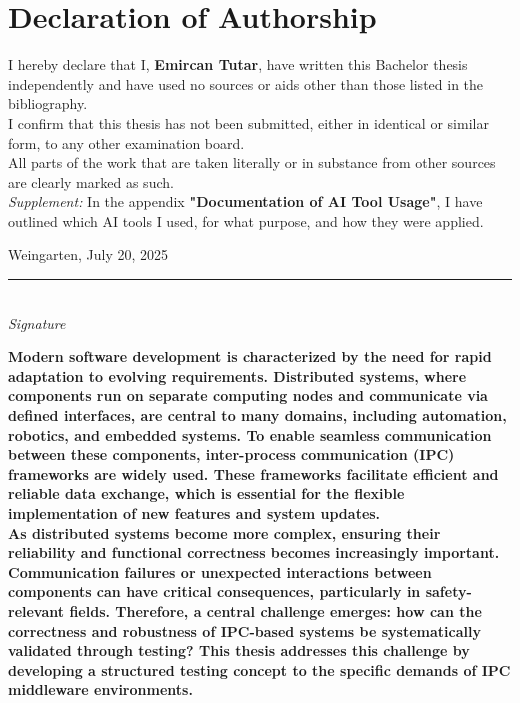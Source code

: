 \documentclass[a4paper,12pt,singlespacing]{article}
\begin{document}
\cleardoublepage
\thispagestyle{empty}

\section*{Declaration of Authorship}
\vspace{2cm}

I hereby declare that I, \textbf{Emircan Tutar}, have written this Bachelor thesis independently and have used no sources or aids other than those listed in the bibliography.\\[0.5cm]

I confirm that this thesis has not been submitted, either in identical or similar form, to any other examination board.\\[0.5cm]

All parts of the work that are taken literally or in substance from other sources are clearly marked as such.\\[0.5cm]

\textit{Supplement:} In the appendix \textbf{"Documentation of AI Tool Usage"}, I have outlined which AI tools I used, for what purpose, and how they were applied.

\vspace{3cm}
Weingarten, July 20, 2025

\vspace{2.5cm}
\rule{8cm}{0.4pt}\\
\textit{Signature}

\cleardoublepage


\pagestyle{plain}
\pagebreak
\vspace*{2cm}
\textbf{Modern software development is characterized by the need for rapid adaptation to evolving requirements. Distributed systems, where components run on separate computing nodes and communicate via defined interfaces, are central to many domains, including automation, robotics, and embedded systems. To enable seamless communication between these components, inter-process communication (IPC) frameworks are widely used. These frameworks facilitate efficient and reliable data exchange, which is essential for the flexible implementation of new features and system updates.} \\

\textbf{As distributed systems become more complex, ensuring their reliability and functional correctness becomes increasingly important. Communication failures or unexpected interactions between components can have critical consequences, particularly in safety-relevant fields. Therefore, a central challenge emerges: how can the correctness and robustness of IPC-based systems be systematically validated through testing? This thesis addresses this challenge by developing a structured testing concept to the specific demands of IPC middleware environments.} \\
\end{document}
